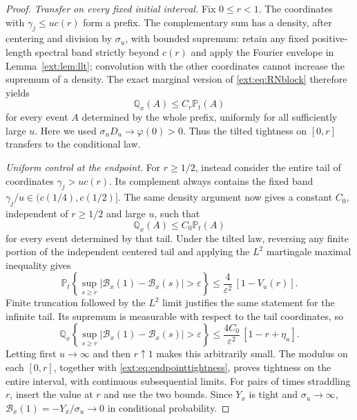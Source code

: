 \documentclass[11pt]{article}
\theoremstyle{definition}
\theoremstyle{remark}
\begin{document}
\begin{proof}
\emph{Transfer on every fixed initial interval.}
Fix $0\le r<1$.  The coordinates with $\gamma_j\le u c(r)$ form a prefix.
The complementary sum has a density, after centering and division by
$\sigma_u$, with bounded supremum: retain any fixed positive-length
spectral band strictly beyond $c(r)$ and apply the Fourier envelope in
Lemma~\ref{ext:lem:llt}; convolution with the other coordinates cannot
increase the supremum of a density.  The exact marginal version of
\eqref{ext:eq:RNblock} therefore yields
\begin{equation}\label{ext:eq:prefixdomination}
 \mathbb Q_x(A)\le C_r\mathbb P_t(A)
\end{equation}
for every event $A$ determined by the whole prefix, uniformly for all
sufficiently large $u$.  Here we used
$\sigma_uD_u\to\varphi(0)>0$.  Thus the tilted tightness on $[0,r]$
transfers to the conditional law.

\emph{Uniform control at the endpoint.}
For $r\ge1/2$, instead consider the entire tail of coordinates
$\gamma_j>u c(r)$.  Its complement always contains the fixed band
$\gamma_j/u\in(c(1/4),c(1/2)]$.  The same density argument now gives a
constant $C_0$, independent of $r\ge1/2$ and large $u$, such that
\[
 \mathbb Q_x(A)\le C_0\mathbb P_t(A)
\]
for every event determined by that tail.
Under the tilted law, reversing any finite portion of the independent
centered tail and applying the $L^2$ martingale maximal inequality gives
\[
 \mathbb P_t\left\{
    \sup_{s\ge r}|\mathcal B_x(1)-\mathcal B_x(s)|>\varepsilon
    \right\}
       \le\frac4{\varepsilon^2}\,[1-V_u(r)].
\]
Finite truncation followed by the $L^2$ limit justifies the same statement
for the infinite tail.  Its supremum is measurable with respect to the
tail coordinates, so
\begin{equation}\label{ext:eq:endpointtightness}
 \mathbb Q_x\left\{
    \sup_{s\ge r}|\mathcal B_x(1)-\mathcal B_x(s)|>\varepsilon
    \right\}
       \le\frac{4C_0}{\varepsilon^2}\,[1-r+\eta_u].
\end{equation}
Letting first $u\to\infty$ and then $r\uparrow1$ makes this arbitrarily
small.  The modulus on each $[0,r]$, together with
\eqref{ext:eq:endpointtightness}, proves tightness on the entire
interval, with continuous subsequential limits.  For pairs of times
straddling $r$, insert the value at $r$ and use the two bounds.
Since $Y_x$ is tight and $\sigma_u\to\infty$,
$\mathcal B_x(1)=-Y_x/\sigma_u\to0$ in conditional probability.


\end{proof}
\end{document}
